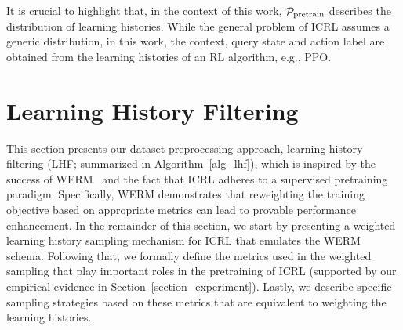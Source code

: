 \documentclass{article}
\begin{document}
It is crucial to highlight that, in the context of this work, ${\mathcal P}_{\text{pretrain}}$ describes the distribution of learning histories. While the general problem of ICRL assumes a generic distribution, in this work, the context, query state and action label are obtained from the learning histories of an RL algorithm, e.g., PPO.


%







\section{Learning History Filtering}
\label{section_LHF}


This section presents our dataset preprocessing approach, learning history filtering (LHF; summarized in Algorithm~\ref{alg_lhf}), which is inspired by the success of WERM~\cite{zhang2025reweighting} and the fact that ICRL adheres to a supervised pretraining paradigm. Specifically, WERM demonstrates that reweighting the training objective based on appropriate metrics can lead to provable performance enhancement.
%
In the remainder of this section, we start by presenting a weighted learning history sampling mechanism for ICRL that emulates the WERM schema. Following that, we formally define the metrics used in the weighted sampling that play important roles in the pretraining of ICRL (supported by our empirical evidence in Section~\ref{section_experiment}). Lastly, we describe specific sampling strategies based on these metrics that are equivalent to weighting the learning histories.
\end{document}
